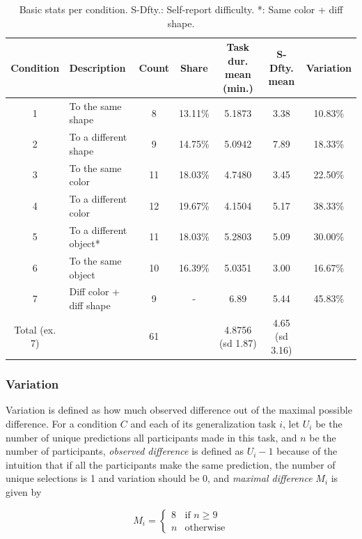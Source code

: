\documentclass{article}
\begin{document}
\begin{table}[h!]
  \centering
  \begin{tabular}{c|l|c|c|c|c|c}
  Condition & Description & Count & Share & Task dur. mean (min.) & S-Dfty. mean & Variation \\
  \hline
  1        & To the same shape     & 8     & 13.11\% & 5.1873 & 3.38 & 10.83\% \\
  2        & To a different shape  & 9     & 14.75\% & 5.0942 & 7.89 & 18.33\% \\
  3        & To the same color     & 11    & 18.03\% & 4.7480 & 3.45 & 22.50\% \\
  4        & To a different color  & 12    & 19.67\% & 4.1504 & 5.17 & 38.33\% \\
  5        & To a different object* & 11    & 18.03\% & 5.2803 & 5.09 & 30.00\% \\
  6        & To the same object    & 10    & 16.39\% & 5.0351 & 3.00 & 16.67\% \\
  7        & Diff color + diff shape & 9    & - & 6.89 & 5.44 & 45.83\% \\
  \hline
  Total (ex. 7)    &                       & 61    &         & 4.8756 (sd 1.87) & 4.65 (sd 3.16) & \\
  \end{tabular}
  \caption{Basic stats per condition. S-Dfty.: Self-report difficulty.
  *: Same color + diff shape.}
  \label{table:conditions}
\end{table}

\subsubsection*{Variation}

Variation is defined as how much observed difference out of the maximal possible difference.
%
For a condition $C$ and each of its generalization task $i$, let $U_i$ be the number of unique predictions all participants made in this task, and $n$ be the number of participants, \emph{observed difference} is defined as $U_i - 1$ because of the intuition that if all the participants make the same prediction, the number of unique selections is 1 and variation should be 0, and \emph{maximal difference} $M_i$ is given by

\[M_i=
  \begin{cases}
    8 & \text{if } n \geq 9 \\
    n & \text{otherwise}
  \end{cases}
\]
\end{document}
